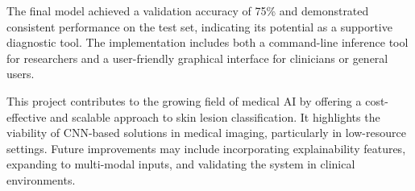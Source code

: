 The final model achieved a validation accuracy of 75\% and demonstrated consistent performance on the test set, indicating its potential as a supportive diagnostic tool. The implementation includes both a command-line inference tool for researchers and a user-friendly graphical interface for clinicians or general users.

This project contributes to the growing field of medical AI by offering a cost-effective and scalable approach to skin lesion classification. It highlights the viability of CNN-based solutions in medical imaging, particularly in low-resource settings. Future improvements may include incorporating explainability features, expanding to multi-modal inputs, and validating the system in clinical environments.

\vfill
\clearpage